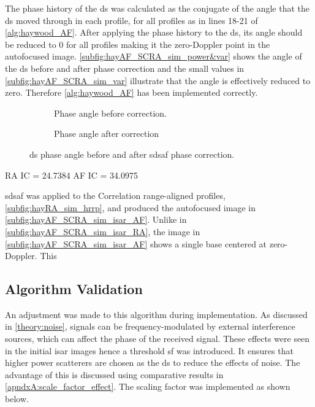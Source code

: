 \documentclass[class=report,11pt,crop=false]{standalone}
\begin{document}
    The phase history of the \gls{ds} was calculated as the conjugate of the angle that the \gls{ds} moved through in each profile, for all profiles as in lines 18-21 of \autoref{alg:haywood_AF}. After applying the phase history to the \gls{ds}, its angle should be reduced to 0 for all profiles making it the zero-Doppler point in the autofocused image. \autoref{subfig:hayAF_SCRA_sim_power&var} shows the angle of the \gls{ds} before and after phase correction and the small values in \autoref{subfig:hayAF_SCRA_sim_var} illustrate that the angle is effectively reduced to zero. Therefore \autoref{alg:haywood_AF} has been implemented correctly.
    \begin{figure}
        \centering
        \begin{subfigure}{0.45\linewidth}
            \resizebox{\linewidth}{!}{}
            \caption{Phase angle before correction.} \label{subfig:hayAF_SCRA_sim_DSangle_before}
        \end{subfigure}
        \hspace{1cm}
        \begin{subfigure}{0.45\linewidth}
            \resizebox{\linewidth}{!}{}
            \caption{Phase angle after correction} \label{subfig:hayAF_SCRA_sim_DSangle_after}
        \end{subfigure}
        \caption{\gls{ds} phase angle before and after \gls{sdsaf} phase correction.\label{subfig:hayAF_SCRA_sim_DSangle}}
    \end{figure}
    
    RA IC = 24.7384
    AF IC = 34.0975
    
    \gls{sdsaf} was applied to the Correlation range-aligned profiles, \autoref{subfig:hayRA_sim_hrrp}, and produced the autofocused image in \autoref{subfig:hayAF_SCRA_sim_isar_AF}. Unlike in \autoref{subfig:hayAF_SCRA_sim_isar_RA}, the image in \autoref{subfig:hayAF_SCRA_sim_isar_AF} shows a single base centered at zero-Doppler. This    
    
    \subsection{Algorithm Validation}
     An adjustment was made to this algorithm during implementation. As discussed in \autoref{theory:noise}, signals can be frequency-modulated by external interference sources, which can affect the phase of the received signal. These effects were seen in the initial \gls{isar} images hence a threshold \gls{sf} was introduced. It ensures that higher power scatterers are chosen as the \gls{ds} to reduce the effects of noise. The advantage of this is discussed using comparative results in \autoref{apndxA:scale_factor_effect}. The scaling factor was implemented as shown below.
       
\end{document}
